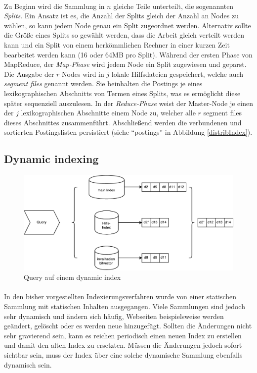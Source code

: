 \paragraph{}
Zu Beginn wird die Sammlung in $n$ gleiche Teile unterteilt, die sogenannten \textit{Splits}. Ein Ansatz ist es, die Anzahl der Splits gleich der Anzahl an Nodes zu wählen, so kann jedem Node genau ein Split zugeordnet werden. Alternativ sollte die Größe eines Splits so gewählt werden, dass die Arbeit gleich verteilt werden kann und ein Split von einem herkömmlichen Rechner in einer kurzen Zeit bearbeitet werden kann (16 oder 64MB pro Split). Während der ersten Phase von MapReduce, der \textit{Map-Phase} wird jedem Node ein Split zugewiesen und geparst. Die Ausgabe der $r$ Nodes wird in $j$ lokale Hilfsdateien gespeichert, welche auch \textit{segment files} genannt werden. Sie beinhalten die Postings je eines lexikographischen Abschnitts von Termen eines Splits, was es ermöglicht diese später sequenziell auszulesen. In der \textit{Reduce-Phase} weist der Master-Node je einen der $j$ lexikographischen Abschnitte einem Node zu, welcher alle $r$ segment files dieses Abschnittes zusammenführt. Abschließend werden die verbundenen und sortierten Postingslisten persistiert (siehe \enquote{postings} in Abbildung \ref{distribIndex}).\par

\subsection{Dynamic indexing} \label{Section:dynamicIndex}
\begin{figure}[ht]
  \includegraphics[width=\textwidth,height=.25\textheight]{pdf/dynIndexCrop.pdf}
  \caption{Query auf einem dynamic index}
  \label{dynIndex}
\end{figure}

\paragraph{}
In den bisher vorgestellten Indexierungsverfahren wurde von einer statischen Sammlung mit statischen Inhalten ausgegangen. Viele Sammlungen sind jedoch sehr dynamisch und ändern sich häufig, Webseiten beispielsweise werden geändert, gelöscht oder es werden neue hinzugefügt. Sollten die Änderungen nicht sehr gravierend sein, kann es reichen periodisch einen neuen Index zu erstellen und damit den alten Index zu ersetzten. Müssen die Änderungen jedoch sofort sichtbar sein, muss der Index über eine solche dynamische Sammlung ebenfalls dynamisch sein.\par

